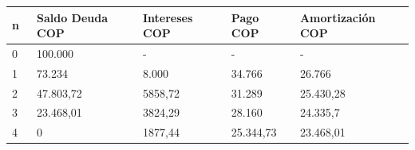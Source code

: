	      \begin{spacing}{1.1}
		      \begin{center}
			      \begin{tabular}{|p{1cm}|p{2cm}|p{2.1cm}|p{2cm}|p{2.5cm}|}
				      \hline
				      \rowcolor{white!50}
				      \textbf{n\ } & \textbf{Saldo Deuda COP} & \textbf{Intereses COP } & \textbf{Pago COP } & \textbf{Amortización COP} \\ \hline
				      
				      0            &   100.000         & -    & -  & -    \\ \hline
				      1            &   73.234           &   8.000          &   34.766      &   26.766             \\ \hline
				      2            &   47.803,72           &   5858,72             &   31.289      &   25.430,28             \\ \hline
				      3            &   23.468,01           &   3824,29             &   28.160      &   24.335,7            \\ \hline
				      4            &   0               &   1877,44             &   25.344,73      &   23.468,01             \\ \hline
			      \end{tabular}
		      \end{center}
	      \end{spacing}
